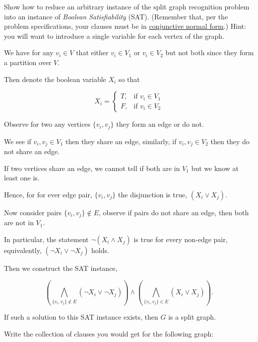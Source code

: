 \begin{questions}
	\question[4] Show how  to reduce an arbitrary  instance of the split  graph recognition problem
	into  an instance  of  \emph {Boolean  Satisfiability}  (SAT). (Remember that, per the problem specifications, your clauses must be in \href{https://en.wikipedia.org/wiki/Conjunctive_normal_form}{conjunctive normal form}.) Hint:  you  will want  to
	introduce a single variable for each vertex of the graph.

	\begin{soln}
		We have for any \(v_i \in V\) that either \(v_i \in V_1\) or \(v_i \in V_2\) but not both since they form a partition over \(V\).

		Then denote the boolean variable \(X_i\) so that

		\[
			X_i =
			\begin{cases}
				T, & \text{if } v_i \in V_1 \\
				F, & \text{if } v_i \in V_2
			\end{cases}
		\]

		Observe for two any vertices \(\{v_i, v_j\}\) they form an edge or do not.

		We see if \(v_i, v_j \in V_1\) then they share an edge, similarly, if \(v_i, v_j \in V_2\) then they do not share an edge.

		If two vertices share an edge, we cannot tell if both are in \(V_1\) but we know at least one is.

		Hence, for for ever edge pair, \(\{v_i, v_j\}\) the disjunction is true, \((X_i \lor X_j)\).

		Now consider pairs \(\{v_i, v_j\} \notin E\), observe if pairs do not share an edge, then both are not in \(V_1\).

		In particular, the statement \(\lnot (X_i \land X_j )\) is true for every non-edge pair, equivalently, \((\lnot X_i \lor \lnot X_j)\) holds.

		Then we construct the SAT instance,

		\[
			\left(\bigwedge_{\{v_i, v_j\} \notin E}  (\lnot X_i \lor \lnot X_j)\right) \land \left(\bigwedge_{\{v_i, v_j\} \in E}(X_i \lor X_j)\right).
		\]

		If such a solution to this SAT instance exists, then \(G\) is a split graph.
	\end{soln}

	\ifsolutions\fi

	\question[1] Write the collection of clauses you would get for the following graph:


\end{questions}
